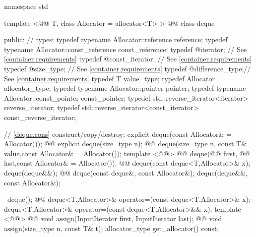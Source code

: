 \documentclass[american,twoside]{book}
\begin{document}
\begin{codeblock}
namespace std {
  template <@@ T, class Allocator = allocator<T> >
  @@
  class deque {
  public:
    // types:
    typedef typename Allocator::reference         reference;
    typedef typename Allocator::const_reference   const_reference;
    typedef @\impdef@                iterator;       // See \ref{container.requirements}
    typedef @\impdef@                const_iterator; // See \ref{container.requirements}
    typedef @\impdef@                size_type;      // See \ref{container.requirements}
    typedef @\impdef@                difference_type;// See \ref{container.requirements}
    typedef T                                     value_type;
    typedef Allocator                             allocator_type;
    typedef typename Allocator::pointer           pointer;
    typedef typename Allocator::const_pointer     const_pointer;
    typedef std::reverse_iterator<iterator>       reverse_iterator;
    typedef std::reverse_iterator<const_iterator> const_reverse_iterator;

    // \ref{deque.cons} construct/copy/destroy:
    explicit deque(const Allocator& = Allocator());
    @@ explicit deque(size_type n);
    @@ deque(size_type n, const T& value,const Allocator& = Allocator());
    template <@@>
      @@ 
      deque(@@ first, @@ last,const Allocator& = Allocator());
    @@ deque(const deque<T,Allocator>& x);
    deque(deque&&);
    @@ deque(const deque&, const Allocator&);
    deque(deque&&, const Allocator&);

   ~deque();
    @@ 
      deque<T,Allocator>& operator=(const deque<T,Allocator>& x);
    deque<T,Allocator>& operator=(const deque<T,Allocator>&& x);
    template <@@>
      @@
      void assign(InputIterator first, InputIterator last);
    @@ void assign(size_type n, const T& t);
    allocator_type get_allocator() const;

}}
\end{codeblock}
\end{document}

